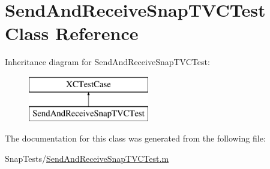 \hypertarget{interface_send_and_receive_snap_t_v_c_test}{}\section{Send\+And\+Receive\+Snap\+T\+V\+C\+Test Class Reference}
\label{interface_send_and_receive_snap_t_v_c_test}
Inheritance diagram for Send\+And\+Receive\+Snap\+T\+V\+C\+Test\+:\begin{figure}[H]
\begin{center}
\leavevmode
\includegraphics[height=2.000000cm]{interface_send_and_receive_snap_t_v_c_test}
\end{center}
\end{figure}


The documentation for this class was generated from the following file\+:\begin{DoxyCompactItemize}
\item 
Snap\+Tests/\hyperlink{_send_and_receive_snap_t_v_c_test_8m}{Send\+And\+Receive\+Snap\+T\+V\+C\+Test.\+m}\end{DoxyCompactItemize}

